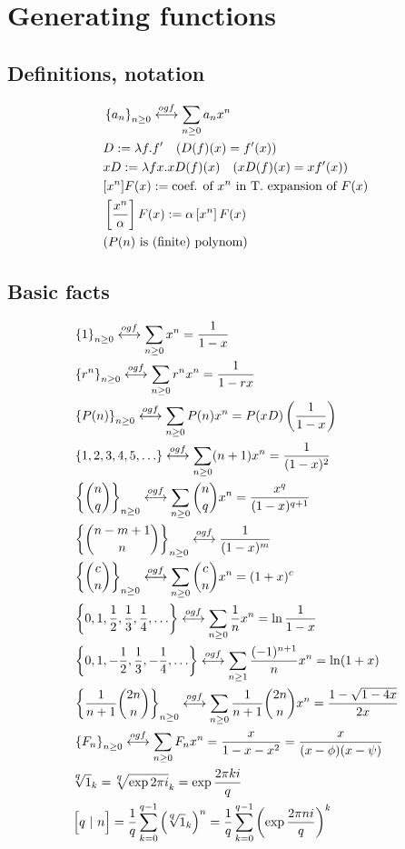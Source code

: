 \section{Generating functions}
\subsection{Definitions, notation}
\begin{align*}
&\left\lbrace a_n\right\rbrace_{n\geq 0} \overset{ogf}{\longleftrightarrow} \sum_{n \geq 0} a_n x^n\\ 
&D := \lambda f . f' ~~~ (D(f)(x) = f'(x))\\
&xD := \lambda f x . x D(f)(x) ~~~ (xD(f)(x) = xf'(x))\\
&[x^n]F(x) := \text{coef. of $x^n$ in T. expansion of $F(x)$}\\
&\left[\dfrac{x^n}{\alpha}\right]F(x) := \alpha \left[x^n\right]F(x)\\
&\text{($P(n)$ is (finite) polynom)}\\
\end{align*}

\subsection{Basic facts}
\begin{align*}
&\nseq{1} \ogf \sum_{n \geq 0} x^n = \dfrac{1}{1-x}\\
&\nseq{r^n} \ogf \sum_{n \geq 0} r^n x^n = \dfrac{1}{1-rx}\\
&\nseq{P(n)} \ogf \sum_{n \geq 0} P(n) x^n = P(xD) \left(\dfrac{1}{1-x}\right)\\
&\seq{1,2,3,4,5,\ldots} \ogf \sum_{n \geq 0} (n+1) x^n = \dfrac{1}{(1-x)^2}\\
&\nseq{{n \choose q}} \ogf \sum_{n\geq 0}{n \choose q} x^n =  \dfrac{x^q}{(1-x)^{q+1}}\\
&\nseq{{n - m + 1 \choose n}} \ogf \dfrac{1}{(1-x)^m}\\
&\nseq{{c \choose n}} \ogf \sum_{n \geq 0} {c \choose n} x^n = (1+x)^c\\
&\seq{0, 1, \dfrac{1}{2}, \dfrac{1}{3}, \dfrac{1}{4}, \ldots} \ogf \sum_{n \geq 0} \dfrac{1}{n} x^n = \ln \dfrac{1}{1-x}\\
&\seq{0, 1, -\dfrac{1}{2}, \dfrac{1}{3}, -\dfrac{1}{4}, \ldots} \ogf \sum_{n \geq 1} \dfrac{(-1)^{n+1}}{n} x^n = \ln(1+x) \\
&\nseq{\dfrac{1}{n+1} {2n \choose n}} \ogf \sum_{n \geq 0} \dfrac{1}{n+1} {2n \choose n} x^n = \dfrac{1 - \sqrt{1 - 4x}}{2x} \\
&\nseq{F_n} \ogf \sum_{n \geq 0} F_n x^n = \dfrac{x}{1 - x - x^2} = \dfrac{x}{(x - \phi)(x - \psi)}\\
& \nthroot{q}{1}_{k} = \nthroot{q}{\exp{2\pi i}}_{k} = \exp{\dfrac{2\pi ki}{q}}\\
&\Big[q ~|~ n\Big] = 
\dfrac{1}{q} \sum_{k=0}^{q-1} \left(\nthroot{q}{1}_{k}\right)^n = 
\dfrac{1}{q} \sum_{k=0}^{q-1} \left( \exp{\dfrac{2\pi n i}{q}} \right)^k  \\
\end{align*}


